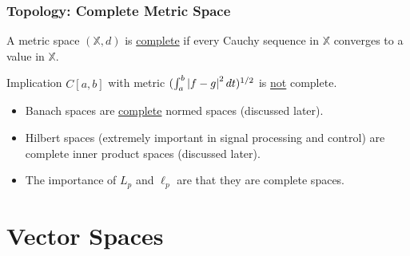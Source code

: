 \documentclass{beamer}
\begin{document}
\begin{frame}\frametitle{Topology: Complete Metric Space}

\begin{definition}
A metric space $(\mathbb{X},d)$ is \underline{complete} if every Cauchy sequence in $\mathbb{X}$ converges to a value in $\mathbb{X}$.\\
\end{definition}

\begin{block}{Implication}
 $C[a,b]$ with metric $(\int_{a}^{b}\left|f-g\right|^2 dt)^{1/2}$ is \underline{not} complete.	
\end{block}

\begin{itemize}
\item Banach spaces are \underline{complete} normed spaces (discussed later).
\item Hilbert spaces (extremely important in signal processing and control) are complete inner product spaces (discussed later).
\item The importance of $L_p$ and $\ell_p$ are that they are complete spaces.
\end{itemize}

%
%
%
\end{frame}

\section{Vector Spaces}
\frame{\sectionpage}
\end{document}
